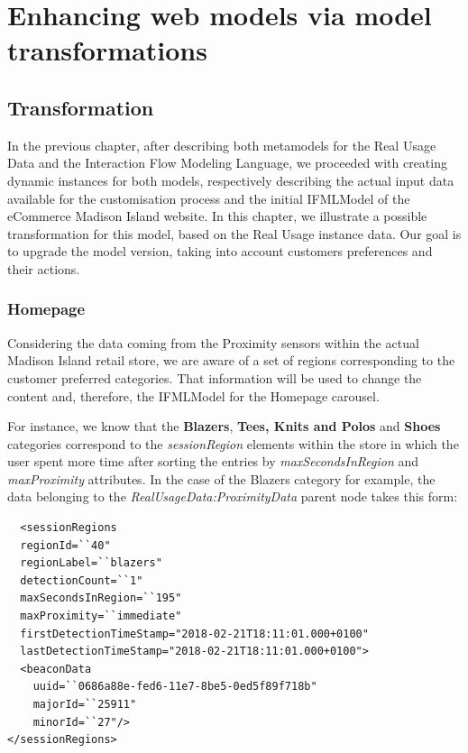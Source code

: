 \chead{}

\chapter{Enhancing web models via model transformations}
\label{enhancing-web-models-via-model-transformations}

\section{Transformation}

In the previous chapter, after describing both metamodels for the Real Usage Data and the Interaction Flow Modeling Language, we proceeded with creating dynamic instances for both models, respectively describing the actual input data available for the customisation process and the initial IFMLModel of the eCommerce Madison Island website. In this chapter, we illustrate a possible transformation for this model, based on the Real Usage instance data. Our goal is to upgrade the model version, taking into account customers preferences and their actions.

\subsection{Homepage}
\label{homepage-updates}
Considering the data coming from the Proximity sensors within the actual Madison Island retail store, we are aware of a set of regions corresponding to the customer preferred categories. That information will be used to change the content and, therefore, the IFMLModel for the Homepage carousel.

For instance, we know that the \textbf{Blazers}, \textbf{Tees, Knits and Polos} and \textbf{Shoes} categories correspond to the \textit{sessionRegion} elements within the store in which the user spent more time after sorting the entries by \textit{maxSecondsInRegion} and \textit{maxProximity} attributes. In the case of the Blazers category for example, the data belonging to the \textit{RealUsageData:ProximityData} parent node takes this form:

\vspace{0.5cm}
\lstset{language=XML}
\begin{lstlisting} 
  <sessionRegions
  regionId=``40"
  regionLabel=``blazers"
  detectionCount=``1"
  maxSecondsInRegion=``195"
  maxProximity=``immediate"
  firstDetectionTimeStamp="2018-02-21T18:11:01.000+0100"
  lastDetectionTimeStamp="2018-02-21T18:11:01.000+0100">
  <beaconData
    uuid=``0686a88e-fed6-11e7-8be5-0ed5f89f718b"
    majorId=``25911"
    minorId=``27"/>
</sessionRegions>
\end{lstlisting}
\vspace{0.5cm}

